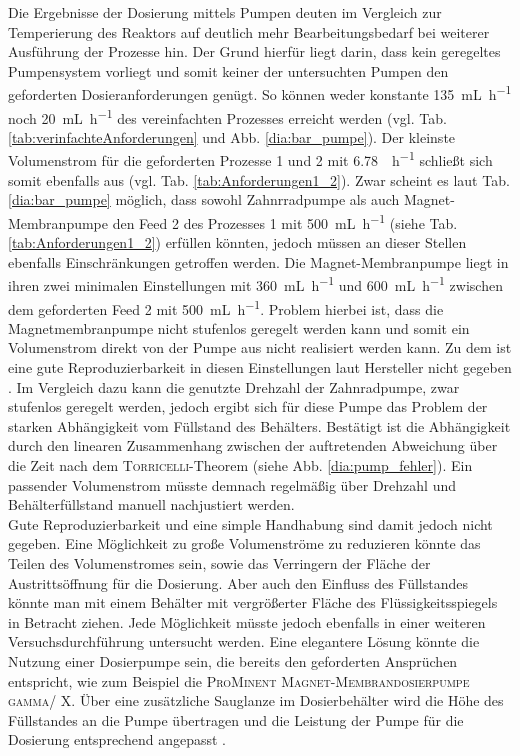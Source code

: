 Die Ergebnisse der Dosierung mittels Pumpen deuten im Vergleich zur Temperierung des Reaktors auf deutlich mehr Bearbeitungsbedarf bei weiterer Ausführung der Prozesse hin. Der Grund hierfür liegt darin, dass kein geregeltes Pumpensystem vorliegt und somit keiner der untersuchten Pumpen den geforderten Dosieranforderungen genügt. So können weder konstante \SI{135}{\milli \liter \per \hour} noch \SI{20}{\milli \liter \per \hour} des vereinfachten Prozesses erreicht werden (vgl. Tab. \ref{tab:verinfachteAnforderungen} und Abb. \ref{dia:bar_pumpe}). Der kleinste Volumenstrom für die geforderten Prozesse 1 und 2 mit \SI{6,78}{\milli \per \hour} schließt sich somit ebenfalls aus (vgl. Tab. \ref{tab:Anforderungen1_2}). Zwar scheint es laut Tab. \ref{dia:bar_pumpe} möglich, dass sowohl Zahnrradpumpe als auch Magnet-Membranpumpe den Feed 2 des Prozesses 1 mit \SI{500}{\milli \liter \per \hour} (siehe Tab. \ref{tab:Anforderungen1_2}) erfüllen könnten, jedoch müssen an dieser Stellen ebenfalls Einschränkungen getroffen werden. Die Magnet-Membranpumpe liegt in ihren zwei minimalen Einstellungen mit \SI{360}{\milli \liter \per \hour} und \SI{600}{\milli \liter \per \hour} zwischen dem geforderten Feed 2 mit \SI{500}{\milli \liter \per \hour}. Problem hierbei ist, dass die Magnetmembranpumpe nicht stufenlos geregelt werden kann und somit ein Volumenstrom direkt von der Pumpe aus nicht realisiert werden kann. Zu dem ist eine gute Reproduzierbarkeit in diesen Einstellungen laut Hersteller nicht gegeben \cite[S. 7]{prominent_beta_anleitung}. Im Vergleich dazu kann die genutzte Drehzahl der Zahnradpumpe, zwar stufenlos geregelt werden, jedoch ergibt sich für diese Pumpe das Problem der starken Abhängigkeit vom Füllstand des Behälters. Bestätigt ist die Abhängigkeit durch den linearen Zusammenhang zwischen der auftretenden Abweichung über die Zeit nach dem \textsc{Torricelli}-Theorem (siehe Abb. \ref{dia:pump_fehler}). Ein passender Volumenstrom müsste demnach regelmäßig über Drehzahl und Behälterfüllstand manuell nachjustiert werden.\\
Gute Reproduzierbarkeit und eine simple Handhabung sind damit jedoch nicht gegeben. Eine Möglichkeit zu große Volumenströme zu reduzieren könnte das Teilen des Volumenstromes sein, sowie das Verringern der Fläche der Austrittsöffnung für die Dosierung. Aber auch den Einfluss des Füllstandes könnte man mit einem Behälter mit vergrößerter Fläche des Flüssigkeitsspiegels in Betracht ziehen. Jede Möglichkeit müsste jedoch ebenfalls in einer weiteren Versuchsdurchführung untersucht werden. Eine elegantere Lösung könnte die Nutzung einer Dosierpumpe sein, die bereits den geforderten Ansprüchen entspricht, wie zum Beispiel die \linebreak \textsc{ProMinent Magnet-Membrandosierpumpe gamma/ X}. Über eine zusätzliche Sauglanze im Dosierbehälter wird die Höhe des Füllstandes an die Pumpe übertragen und die Leistung der Pumpe für die Dosierung entsprechend angepasst \cite{https:www.industr.com.16.06.2021, prominent_gamma}.

